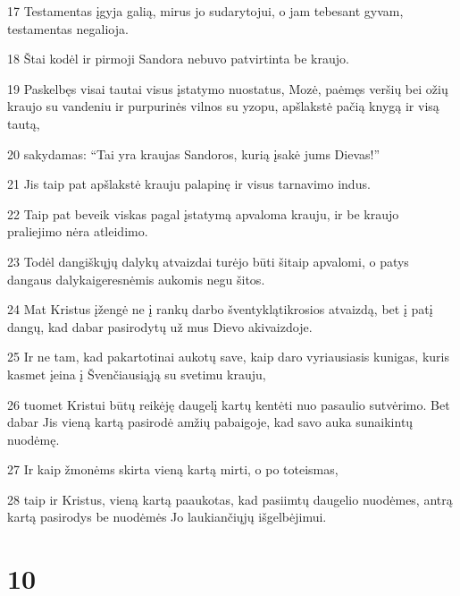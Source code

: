 \par 17 Testamentas įgyja galią, mirus jo sudarytojui, o jam tebesant gyvam, testamentas negalioja. 
\par 18 Štai kodėl ir pirmoji Sandora nebuvo patvirtinta be kraujo. 
\par 19 Paskelbęs visai tautai visus įstatymo nuostatus, Mozė, paėmęs veršių bei ožių kraujo su vandeniu ir purpurinės vilnos su yzopu, apšlakstė pačią knygą ir visą tautą, 
\par 20 sakydamas: “Tai yra kraujas Sandoros, kurią įsakė jums Dievas!” 
\par 21 Jis taip pat apšlakstė krauju palapinę ir visus tarnavimo indus. 
\par 22 Taip pat beveik viskas pagal įstatymą apvaloma krauju, ir be kraujo praliejimo nėra atleidimo. 
\par 23 Todėl dangiškųjų dalykų atvaizdai turėjo būti šitaip apvalomi, o patys dangaus dalykai­geresnėmis aukomis negu šitos. 
\par 24 Mat Kristus įžengė ne į rankų darbo šventyklą­tikrosios atvaizdą, bet į patį dangų, kad dabar pasirodytų už mus Dievo akivaizdoje. 
\par 25 Ir ne tam, kad pakartotinai aukotų save, kaip daro vyriausiasis kunigas, kuris kasmet įeina į Švenčiausiąją su svetimu krauju,­ 
\par 26 tuomet Kristui būtų reikėję daugelį kartų kentėti nuo pasaulio sutvėrimo. Bet dabar Jis vieną kartą pasirodė amžių pabaigoje, kad savo auka sunaikintų nuodėmę. 
\par 27 Ir kaip žmonėms skirta vieną kartą mirti, o po to­teismas, 
\par 28 taip ir Kristus, vieną kartą paaukotas, kad pasiimtų daugelio nuodėmes, antrą kartą pasirodys be nuodėmės Jo laukiančiųjų išgelbėjimui.


\chapter{10}


